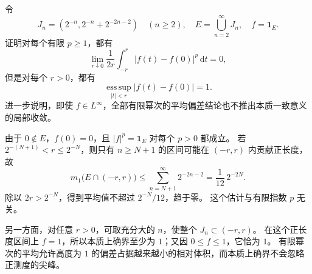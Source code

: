 \begin{exercise}\label{b1:ex:14-finite-p-endpoint}
令
\[
 J_n=(2^{-n},2^{-n}+2^{-2n-2})\quad(n\geq2),\quad
 E=\bigcup_{n=2}^{\infty}J_n,\quad f=\mathbf1_E.
\]
证明对每个有限 \(p\geq1\)，都有
\[
 \lim_{r\downarrow0}\frac1{2r}\int_{-r}^r|f(t)-f(0)|^p\,\mathrm dt=0,
\]
但是对每个 \(r>0\)，都有
\[
 \operatorname*{ess\,sup}_{|t|<r}|f(t)-f(0)|=1.
\]
进一步说明，即使 \(f\in L^\infty\)，全部有限幂次的平均偏差结论也不推出本质一致意义的局部收敛。
\end{exercise}
\begin{solution}
由于 \(0\notin E\)，\(f(0)=0\)，且 \(|f|^p=\mathbf1_E\) 对每个 \(p>0\) 都成立。
若 \(2^{-(N+1)}<r\leq2^{-N}\)，则只有 \(n\geq N+1\) 的区间可能在 \((-r,r)\) 内贡献正长度，故
\[
 m_1\bigl(E\cap(-r,r)\bigr)
 \leq\sum_{n=N+1}^{\infty}2^{-2n-2}
 =\frac1{12}\,2^{-2N}.
\]
除以 \(2r>2^{-N}\)，得到平均值不超过 \(2^{-N}/12\)，趋于零。
这个估计与有限指数 \(p\) 无关。

另一方面，对任意 \(r>0\)，可取充分大的 \(n\)，使整个 \(J_n\subset(-r,r)\)。
在这个正长度区间上 \(f=1\)，所以本质上确界至少为 \(1\)；又因 \(0\leq f\leq1\)，它恰为 \(1\)。
有限幂次的平均允许高度为 \(1\) 的偏差占据越来越小的相对体积，而本质上确界不会忽略正测度的尖峰。
\end{solution}

